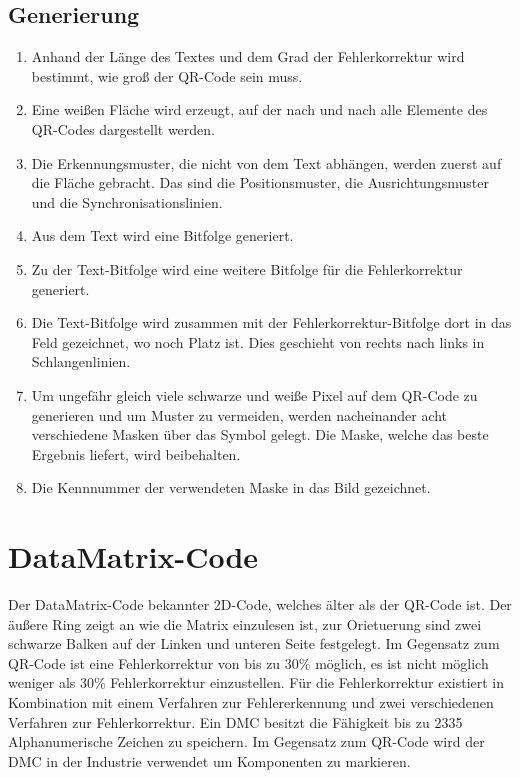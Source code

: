 \documentclass[12pt,					%
							 oneside,			%
							 a4paper,			%
							 halfparskip,		%
							 liststotoc,			%
							 bibtotoc,			%
							 fleqn,				%
							 pointlessnumbers]	%
							 {scrreprt}
\begin{document}
\subsection{Generierung}
\begin{enumerate}
\item Anhand der Länge des Textes und dem Grad der Fehlerkorrektur wird bestimmt, wie groß der QR-Code sein muss. 
\item Eine weißen Fläche wird erzeugt, auf der nach und nach alle Elemente des QR-Codes dargestellt werden. 
\item Die Erkennungsmuster, die nicht von dem Text abhängen, werden zuerst auf die Fläche gebracht. Das sind die Positionsmuster, die  Ausrichtungsmuster und die Synchronisationslinien.
\item Aus dem Text wird eine Bitfolge generiert.
\item Zu der Text-Bitfolge wird eine weitere Bitfolge für die Fehlerkorrektur generiert.
\item Die Text-Bitfolge wird zusammen mit der Fehlerkorrektur-Bitfolge dort in das Feld gezeichnet, wo noch Platz ist. Dies geschieht von rechts nach links in Schlangenlinien.
\item Um ungefähr gleich viele schwarze und weiße Pixel auf dem QR-Code zu generieren und um Muster zu vermeiden, werden nacheinander acht verschiedene Masken über das Symbol gelegt. Die Maske, welche das beste Ergebnis liefert, wird beibehalten.
\item Die Kennnummer der verwendeten Maske in das Bild gezeichnet.
\end{enumerate}

\newpage
\section{DataMatrix-Code}
Der DataMatrix-Code bekannter 2D-Code, welches älter als der QR-Code ist. Der äußere Ring zeigt an wie die Matrix einzulesen ist, zur Orietuerung sind zwei schwarze Balken auf der Linken und unteren Seite festgelegt.
Im Gegensatz zum QR-Code ist eine Fehlerkorrektur von bis zu 30\% möglich, es ist nicht möglich weniger als 30\% Fehlerkorrektur einzustellen. Für die Fehlerkorrektur existiert in Kombination mit einem Verfahren zur Fehlererkennung und zwei verschiedenen Verfahren zur Fehlerkorrektur. 
Ein DMC besitzt die Fähigkeit bis zu 2335 Alphanumerische Zeichen zu speichern. Im Gegensatz zum QR-Code wird der DMC in der Industrie verwendet um Komponenten zu markieren.
\end{document}
